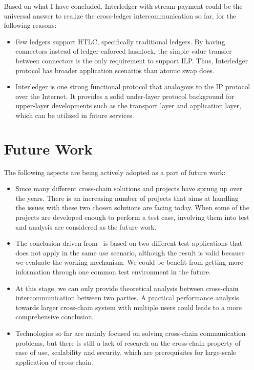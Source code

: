 \noindent Based on what I have concluded, Interledger with stream payment could be the universal answer to realize the cross-ledger intercommunication so far, for the following reasons:
\begin{itemize}
    \item Few ledgers support HTLC, specifically traditional ledgers. By having connectors instead of ledger-enforced hashlock, the simple value transfer between connectors is the only requirement to support ILP. Thus, Interledger protocol has broader application scenarios than atomic swap does.
    \item Interledger is one strong functional protocol that analogous to the IP protocol over the Internet. It provides a solid under-layer protocol background for upper-layer developments such as the transport layer and application layer, which can be utilized in future services.  
\end{itemize}

\section{Future Work}
\noindent The following aspects are being actively adopted as a part of future work:
\begin{itemize}
	\item Since many different cross-chain solutions and projects have sprung up over the years. There is an increasing number of projects that aims at handling the issues with these two chosen solutions are facing today. When some of the projects are developed enough to perform a test case, involving them into test and analysis are considered as the future work.
	\item The conclusion driven from~ is based on two different test applications that does not apply in the same use scenario, although the result is valid because we evaluate the working mechanism. We could be benefit from getting more information through one common test environment in the future.
	\item At this stage, we can only provide theoretical analysis between cross-chain intercommunication between two parties. A practical performance analysis towards larger cross-chain system with multiple users could leads to a more comprehensive conclusion.
	\item Technologies so far are mainly focused on solving cross-chain communication problems, but there is still a lack of research on the cross-chain property of ease of use, scalability and security, which are prerequisites for large-scale application of cross-chain.

	
\end{itemize}  